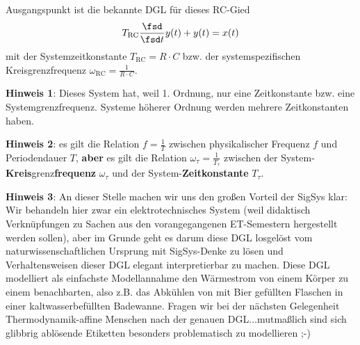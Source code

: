 \begin{Ansatz}
Ausgangspunkt ist die bekannte DGL für dieses RC-Gied
\begin{align}
T_\mathrm{RC}\frac{\fsd}{\fsd t} y(t) + y(t) = x(t)
\end{align}
mit der Systemzeitkonstante $T_\mathrm{RC}=R \cdot C$ bzw. der systemspezifischen
Kreisgrenzfrequenz $\omega_\mathrm{RC}=\frac{1}{R \cdot C}$.
%

\noindent\textbf{Hinweis 1}: Dieses System hat, weil 1. Ordnung, nur eine
Zeitkonstante bzw. eine Systemgrenzfrequenz.
Systeme höherer Ordnung werden mehrere Zeitkonstanten haben.

\noindent\textbf{Hinweis 2}: es gilt die
Relation $f=\frac{1}{T}$ zwischen physikalischer Frequenz $f$ und Periodendauer $T$, \textbf{aber}
es gilt die Relation $\omega_\tau = \frac{1}{T_\tau}$ zwischen der System-\textbf{Kreis}grenz\textbf{frequenz}
$\omega_\tau $ und der System-\textbf{Zeitkonstante} $T_\tau $.

\noindent \textbf{Hinweis 3}:
An dieser Stelle machen wir uns den großen Vorteil der SigSys klar:
%
Wir behandeln hier zwar ein elektrotechnisches System (weil didaktisch
Verknüpfungen zu Sachen aus den vorangegangenen ET-Semestern hergestellt werden
sollen), aber im Grunde geht es darum diese DGL losgelöst vom naturwissenschaftlichen
Ursprung mit SigSys-Denke zu lösen und Verhaltensweisen dieser DGL elegant
interpretierbar zu machen.
%
Diese DGL modelliert als einfachste Modellannahme den Wärmestrom von einem Körper
zu einem benachbarten, also z.B. das Abkühlen von mit Bier gefüllten Flaschen
in einer kaltwasserbefüllten Badewanne. Fragen wir bei der nächsten Gelegenheit
Thermodynamik-affine Menschen nach der genauen DGL...mutmaßlich sind sich glibbrig ablösende Etiketten
besonders problematisch zu modellieren ;-)
\end{Ansatz}

